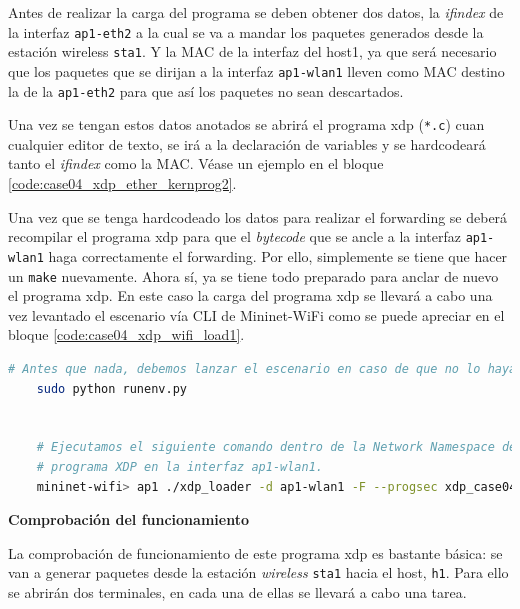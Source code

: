 Antes de realizar la carga del programa se deben obtener dos datos, la \textit{ifindex} de la interfaz \texttt{ap1-eth2} a la cual se va a mandar los paquetes generados desde la estación wireless \texttt{sta1}. Y la MAC de la interfaz del host1, ya que será necesario que los paquetes que se dirijan a la interfaz \texttt{ap1-wlan1} lleven como MAC destino la de la \texttt{ap1-eth2} para que así los paquetes no sean descartados. \\
\par
Una vez se tengan estos datos anotados se abrirá el programa \gls{xdp} (\texttt{*.c}) cuan cualquier editor de texto,  se irá a la declaración de variables y se hardcodeará tanto el \textit{ifindex} como la MAC. Véase un ejemplo en el bloque \ref{code:case04_xdp_ether_kernprog2}.\\
\par

Una vez que se tenga hardcodeado los datos para realizar el forwarding se deberá recompilar el programa \gls{xdp} para que el \textit{bytecode} que se ancle a la interfaz \texttt{ap1-wlan1} haga correctamente el forwarding. Por ello, simplemente se tiene que hacer un \texttt{make} nuevamente. Ahora sí, ya se tiene todo preparado para anclar de nuevo el programa \gls{xdp}. En este caso la carga del programa \gls{xdp} se llevará a cabo una vez levantado el escenario vía CLI de Mininet-WiFi como se puede apreciar en el bloque \ref{code:case04_xdp_wifi_load1}.

\begin{lstlisting}[language= bash, style=Consola, caption={Carga del programa XDP Hardcoded forwarding - Case04},label=code:case04_xdp_wifi_load1]
    # Antes que nada, debemos lanzar el escenario en caso de que no lo hayamos hecho todavía.
    sudo python runenv.py
    
    
    # Ejecutamos el siguiente comando dentro de la Network Namespace del AP1, cargando así el
    # programa XDP en la interfaz ap1-wlan1.
    mininet-wifi> ap1 ./xdp_loader -d ap1-wlan1 -F --progsec xdp_case04 -S
\end{lstlisting}

\vspace{0.7cm}
\textbf{Comprobación del funcionamiento}\\
\par

La comprobación de funcionamiento de este programa \gls{xdp} es bastante básica: se van a generar paquetes desde la estación \textit{wireless} \texttt{sta1} hacia el host, \texttt{h1}. Para ello se abrirán dos terminales, en cada una de ellas se llevará a cabo una tarea.

